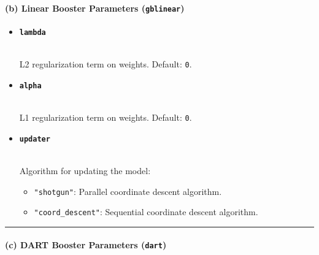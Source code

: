 \documentclass[12pt]{book}
\providecommand{\tightlist}{%
  \setlength{\itemsep}{0pt}\setlength{\parskip}{0pt}}
\begin{document}
\paragraph{\texorpdfstring{\textbf{(b) Linear Booster Parameters
(\texttt{gblinear})}}{(b) Linear Booster Parameters (gblinear)}}\label{b-linear-booster-parameters-gblinear}

\begin{itemize}
\item
  \textbf{\texttt{lambda}}\strut \\
  L2 regularization term on weights. Default: \texttt{0}.
\item
  \textbf{\texttt{alpha}}\strut \\
  L1 regularization term on weights. Default: \texttt{0}.
\item
  \textbf{\texttt{updater}}\strut \\
  Algorithm for updating the model:

  \begin{itemize}
  \tightlist
  \item
    \texttt{"shotgun"}: Parallel coordinate descent algorithm.
  \item
    \texttt{"coord\_descent"}: Sequential coordinate descent algorithm.
  \end{itemize}
\end{itemize}

\begin{center}\rule{0.5\linewidth}{0.5pt}\end{center}

\paragraph{\texorpdfstring{\textbf{(c) DART Booster Parameters
(\texttt{dart})}}{(c) DART Booster Parameters (dart)}}\label{c-dart-booster-parameters-dart}
\end{document}
